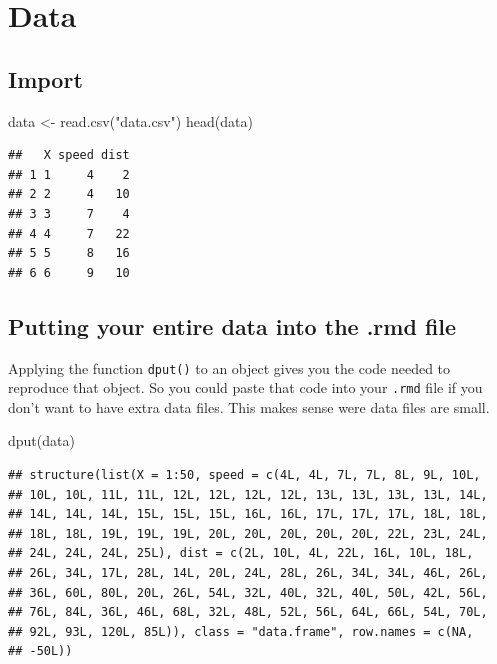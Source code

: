 \documentclass[
  12pt,
]{article}
\newenvironment{Shaded}{\begin{snugshade}}{\end{snugshade}}
\newcommand{\FunctionTok}[1]{\textcolor[rgb]{0.00,0.00,0.00}{#1}}
\newcommand{\NormalTok}[1]{#1}
\newcommand{\OtherTok}[1]{\textcolor[rgb]{0.56,0.35,0.01}{#1}}
\newcommand{\StringTok}[1]{\textcolor[rgb]{0.31,0.60,0.02}{#1}}
\begin{document}
\hypertarget{data}{%
\section{Data}\label{data}}

\hypertarget{import}{%
\subsection{Import}\label{import}}

\begin{Shaded}
\begin{Highlighting}[]
\NormalTok{data }\OtherTok{\textless{}{-}} \FunctionTok{read.csv}\NormalTok{(}\StringTok{"data.csv"}\NormalTok{)}
\FunctionTok{head}\NormalTok{(data)}
\end{Highlighting}
\end{Shaded}

\begin{verbatim}
##   X speed dist
## 1 1     4    2
## 2 2     4   10
## 3 3     7    4
## 4 4     7   22
## 5 5     8   16
## 6 6     9   10
\end{verbatim}

\hypertarget{putting-your-entire-data-into-the-.rmd-file}{%
\subsection{Putting your entire data into the .rmd file}\label{putting-your-entire-data-into-the-.rmd-file}}

Applying the function \texttt{dput()} to an object gives you the code needed to reproduce that object. So you could paste that code into your \texttt{.rmd} file if you don't want to have extra data files. This makes sense were data files are small.

\begin{Shaded}
\begin{Highlighting}[]
\FunctionTok{dput}\NormalTok{(data)}
\end{Highlighting}
\end{Shaded}

\begin{verbatim}
## structure(list(X = 1:50, speed = c(4L, 4L, 7L, 7L, 8L, 9L, 10L, 
## 10L, 10L, 11L, 11L, 12L, 12L, 12L, 12L, 13L, 13L, 13L, 13L, 14L, 
## 14L, 14L, 14L, 15L, 15L, 15L, 16L, 16L, 17L, 17L, 17L, 18L, 18L, 
## 18L, 18L, 19L, 19L, 19L, 20L, 20L, 20L, 20L, 20L, 22L, 23L, 24L, 
## 24L, 24L, 24L, 25L), dist = c(2L, 10L, 4L, 22L, 16L, 10L, 18L, 
## 26L, 34L, 17L, 28L, 14L, 20L, 24L, 28L, 26L, 34L, 34L, 46L, 26L, 
## 36L, 60L, 80L, 20L, 26L, 54L, 32L, 40L, 32L, 40L, 50L, 42L, 56L, 
## 76L, 84L, 36L, 46L, 68L, 32L, 48L, 52L, 56L, 64L, 66L, 54L, 70L, 
## 92L, 93L, 120L, 85L)), class = "data.frame", row.names = c(NA, 
## -50L))
\end{verbatim}
\end{document}
